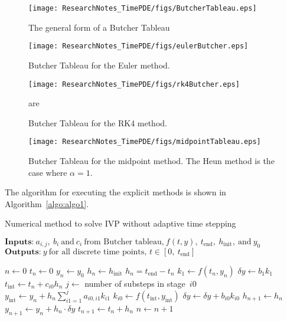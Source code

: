 \begin{figure}[!b]
\centering
\texttt{[image: ResearchNotes\_TimePDE/figs/ButcherTableau.eps]}
\caption{The general form of a Butcher Tableau}
\label{fig:butcherTab}
\end{figure}
\begin{figure}[!b]
\centering
\texttt{[image: ResearchNotes\_TimePDE/figs/eulerButcher.eps]}
\caption{Butcher Tableau for the Euler method.}
\label{fig:eulerButcher}
\end{figure}
\begin{figure}[!b]
\centering
\texttt{[image: ResearchNotes\_TimePDE/figs/rk4Butcher.eps]}
\caption{Butcher Tableau for the RK4 method.}
\label{fig:rk4Butcher}are
\end{figure}
\begin{figure}[!b]
\centering
\texttt{[image: ResearchNotes\_TimePDE/figs/midpointTableau.eps]}
\caption{Butcher Tableau for the midpoint method. The Heun method is the case where $\alpha=1$.}
\label{fig:midpointButcher}
\end{figure}

The algorithm for executing the explicit methods is shown in Algorithm~\ref{algo:algo1}.
\begin{algorithm}[H]
\caption{Numerical method to solve IVP without adaptive time stepping}
\label{algo:algo1}
\hspace*{\algorithmicindent} $\textbf{Inputs:}~a_{i,j},~b_{i}~\text{and}~c_{i}~\text{from Butcher tableau,}~f(t,y),~t_\text{end},~h_\text{init},~\text{and}~y_{0}$ \\
\hspace*{\algorithmicindent} $\textbf{Outputs:}~y~\text{for all discrete time points,~}t\in{}[0,~t_\text{end}] $
\begin{algorithmic}[1]
\State $n \gets 0$
\State $t_{n} \gets 0$
\State $y_{n} \gets y_{0}$
\State $h_{n} \gets h_\text{init}$
    \State $h_{n} = t_\text{end} - t_{n}$
  \EndIf
  \State $k_{1} \gets f(t_{n}, y_{n})$
  \State $\delta{}y \gets b_{1}k_{1}$
    \State $t_\text{int} \gets t_{n} + c_{i0}h_{n}$
    \State $j \gets$ number of substeps in stage~$i0$
    \State $y_\text{int} \gets y_{n} + h_{n}\sum^{j}_{i1=1}a_{i0,i1}k_{i1}$
    \State $k_{i0} \gets f(t_\text{int},y_\text{int})$
    \State $\delta{}y \gets \delta{}y + b_{i0}k_{i0}$
  \EndFor
  \State $h_{n+1} \gets h_{n}$
  \State $y_{n+1} \gets y_{n} + h_{n}\cdot\delta{}y$
  \State $t_{n+1} \gets t_{n} + h_{n}$
  \State $n \gets n+1$
\EndWhile
\end{algorithmic}
\end{algorithm}

